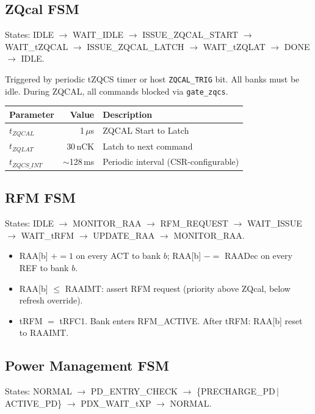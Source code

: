 \documentclass[10pt,a4paper]{article}
\newcommand{\Th}[1]{\cellcolor{thbg}\textbf{\small\color{acc1}#1}}
\newcommand{\RA}{\rowcolor{white}}
\newcommand{\RB}{\rowcolor{altbg}}
\begin{document}
\subsection{ZQcal FSM}

States: IDLE $\to$ WAIT\_IDLE $\to$ ISSUE\_ZQCAL\_START $\to$ WAIT\_tZQCAL $\to$
ISSUE\_ZQCAL\_LATCH $\to$ WAIT\_tZQLAT $\to$ DONE $\to$ IDLE.

Triggered by periodic tZQCS timer or host \texttt{ZQCAL\_TRIG} bit. All banks must be idle.
During ZQCAL, all commands blocked via \texttt{gate\_zqcs}.

\begin{center}
\begin{tabularx}{0.75\linewidth}{@{} l r l @{}}
\toprule
\Th{Parameter} & \Th{Value} & \Th{Description} \\
\midrule
\RA $t_{ZQCAL}$ & 1\,$\mu$s   & ZQCAL Start to Latch \\
\RB $t_{ZQLAT}$ & 30\,nCK     & Latch to next command \\
\RA $t_{ZQCS\_INT}$ & $\sim$128\,ms & Periodic interval (CSR-configurable) \\
\bottomrule
\end{tabularx}
\end{center}

\subsection{RFM FSM}

States: IDLE $\to$ MONITOR\_RAA $\to$ RFM\_REQUEST $\to$ WAIT\_ISSUE $\to$
WAIT\_tRFM $\to$ UPDATE\_RAA $\to$ MONITOR\_RAA.

\begin{itemize}
  \item RAA[b] $+=1$ on every ACT to bank $b$; RAA[b] $-=$ RAADec on every REF to bank $b$.
  \item RAA[b] $\leq$ RAAIMT: assert RFM request (priority above ZQcal, below refresh override).
  \item tRFM $=$ tRFC1. Bank enters RFM\_ACTIVE. After tRFM: RAA[b] reset to RAAIMT.
\end{itemize}

\subsection{Power Management FSM}

States: NORMAL $\to$ PD\_ENTRY\_CHECK $\to$ \{PRECHARGE\_PD\,|\,ACTIVE\_PD\} $\to$
PDX\_WAIT\_tXP $\to$ NORMAL.
\end{document}
